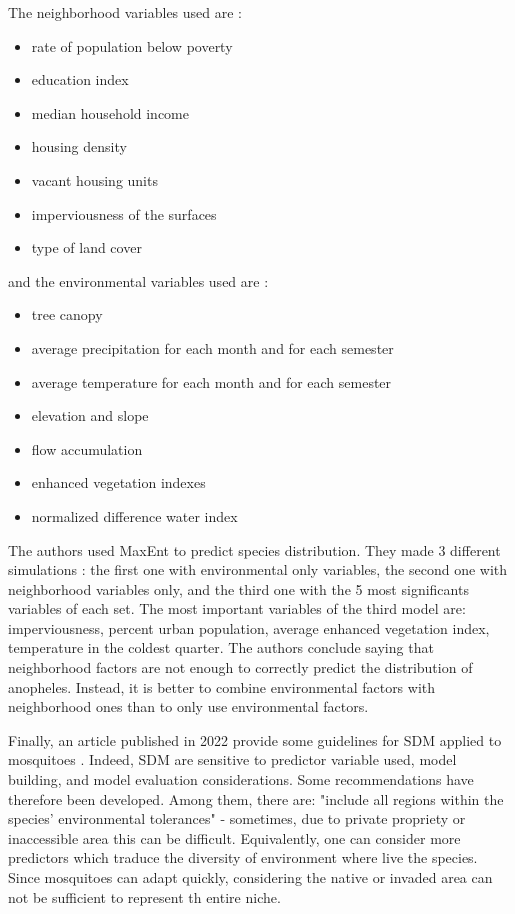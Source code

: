 \documentclass{article}
\begin{document}
The neighborhood variables used are :
\begin{itemize}
\item rate of population below poverty
\item education index
\item median household income
\item housing density
\item vacant housing units
\item imperviousness of the surfaces
\item type of land cover
\end{itemize}

and the environmental variables used are :

\begin{itemize}
\item tree canopy
\item average precipitation for each month and for each semester
\item average temperature for each month and for each semester
\item elevation and slope
\item flow accumulation
\item enhanced vegetation indexes
\item normalized difference water index
\end{itemize}

The authors used MaxEnt to predict species distribution. They made 3 different simulations : the first one with environmental only variables, the second one with neighborhood variables only, and the third one with the 5 most significants variables of each set. The most important variables of the third model are: imperviousness, percent urban population, average enhanced vegetation index, temperature in the coldest quarter.
The authors conclude saying that neighborhood factors are not enough to correctly predict the distribution of anopheles. Instead, it is better to combine environmental factors with neighborhood ones than to only use environmental factors.

\medskip 
Finally, an article published in 2022 provide some guidelines for SDM applied to mosquitoes \cite{barker_species_2022}. Indeed, SDM are sensitive to predictor variable used, model building, and model evaluation considerations. Some recommendations have therefore been developed. Among them, there are: "include all regions within the species' environmental tolerances" - sometimes, due to private propriety or inaccessible area this can be difficult. Equivalently, one can consider more predictors which traduce the diversity of environment where live the species. Since mosquitoes can adapt quickly, considering the native or invaded area can not be sufficient to represent th entire niche. 
\end{document}
